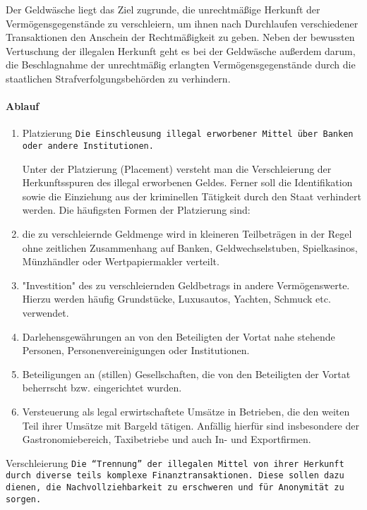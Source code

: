 \documentclass{article}
\begin{document}
		Der Geldwäsche liegt das Ziel zugrunde, die unrechtmäßige Herkunft der Vermögensgegenstände zu verschleiern, um ihnen nach Durchlaufen verschiedener Transaktionen den Anschein der Rechtmäßigkeit zu geben.
		Neben der bewussten Vertuschung der illegalen Herkunft geht es bei der Geldwäsche außerdem darum, die Beschlagnahme der unrechtmäßig erlangten Vermögensgegenstände durch die staatlichen Strafverfolgungsbehörden zu verhindern.

            \paragraph[Ablauf]{Ablauf}

                \begin{enumerate}

                    \item Platzierung
			\texttt{Die Einschleusung illegal erworbener Mittel über Banken oder andere Institutionen.}

			Unter der Platzierung (Placement) versteht man die Verschleierung der Herkunftsspuren des illegal erworbenen Geldes. Ferner soll die Identifikation sowie die Einziehung aus der kriminellen Tätigkeit durch den Staat verhindert werden. Die häufigsten Formen der Platzierung sind:
				\item
					die zu verschleiernde Geldmenge wird in kleineren Teilbeträgen in der Regel ohne zeitlichen Zusammenhang auf Banken, Geldwechselstuben, Spielkasinos, Münzhändler oder Wertpapiermakler verteilt.
				\item
					"Investition" des zu verschleiernden Geldbetrags in andere Vermögenswerte. Hierzu werden häufig Grundstücke, Luxusautos, Yachten, Schmuck etc. verwendet.
				\item
					Darlehensgewährungen an von den Beteiligten der Vortat nahe stehende Personen, Personenvereinigungen oder Institutionen.
				\item
					Beteiligungen an (stillen) Gesellschaften, die von den Beteiligten der Vortat beherrscht bzw. eingerichtet wurden.
				\item
					Versteuerung als legal erwirtschaftete Umsätze in Betrieben, die den weiten Teil ihrer Umsätze mit Bargeld tätigen. Anfällig hierfür sind insbesondere der Gastronomiebereich, Taxibetriebe und auch In- und Exportfirmen.
					
			\end{enumerate}

                    \item Verschleierung
			\texttt{Die “Trennung” der illegalen Mittel von ihrer Herkunft durch diverse teils komplexe Finanztransaktionen. Diese sollen dazu dienen, die Nachvollziehbarkeit zu erschweren und für Anonymität zu sorgen.}
			
\end{document}
